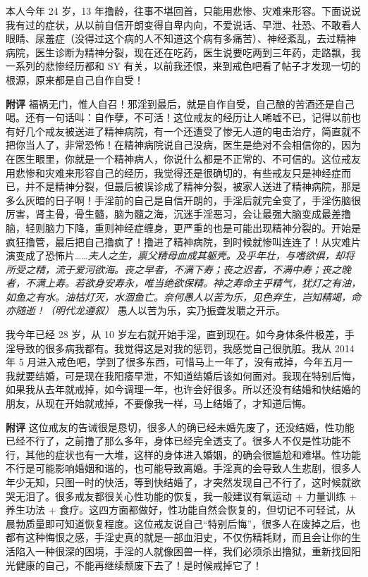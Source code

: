 \begin{case}
    本人今年 24 岁，13 年撸龄，往事不堪回首，只能用悲惨、灾难来形容。下面说说我有过的症状，从以前自信开朗变得自卑内向，不爱说话、早泄、社恐、不敢看人眼睛、尿羞症（没得过这个病的人不知道这个病有多痛苦）、神经紊乱，去过精神病院，医生诊断为精神分裂，现在还在吃药，医生说要吃两到三年药，走路飘，我一系列的悲惨经历都和 SY 有关，以前我还恨，来到戒色吧看了帖子才发现一切的根源，原来都是自己自作自受！

    \textbf{附评} 福祸无门，惟人自召！邪淫到最后，就是自作自受，自己酿的苦酒还是自己喝。还有一句话叫：自作孽，不可活！这位戒友的经历让人唏嘘不已，记得以前也有好几个戒友被送进了精神病院，有一个还遭受了惨无人道的电击治疗，简直就不把你当人了，非常恐怖！在精神病院说自己没病，医生是绝对不会相信你的，因为在医生眼里，你就是一个精神病人，你说什么都是不正常的、不可信的。这位戒友用悲惨和灾难来形容自己的经历，我觉得还是很确切的，有些戒友只是神经症而已，并不是精神分裂，但最后被误诊成了精神分裂，被家人送进了精神病院，那是多么灰暗的日子啊！手淫前的自己是自信开朗的，手淫后就完全变了，手淫伤脑很厉害，肾主骨，骨生髓，脑为髓之海，沉迷手淫恶习，会让最强大脑变成最差撸脑，轻则脑力下降，重则神经症缠身，更严重的也是可能出现精神分裂的。开始是疯狂撸管，最后把自己撸疯了！撸进了精神病院，到时候就惨叫连连了！从灾难片演变成了恐怖片……\textit{夫人之生，禀父精母血成其躯壳。及乎年壮，与嗜欲俱，却将所受之精，流于爱河欲海。丧之早者，不满下寿；丧之迟者，不满中寿；丧之晚者，不满上寿。若欲身安寿永，唯当绝欲保精。神之寿命主乎精气，犹灯之有油，如鱼之有水。油枯灯灭，水涸鱼亡。奈何愚人以苦为乐，见色弃生，岂知精竭，命亦随逝！（明代龙遵叙）} 愚人以苦为乐，实乃振聋发聩之开示。
\end{case}

\begin{case}
    我今年已经 28 岁，从 10 岁左右就开始手淫，直到现在。如今身体条件极差，手淫导致的很多病我都有。我觉得这是对我的惩罚，我感觉自己很肮脏。我从 2014 年 5 月进入戒色吧，学到了很多东西，可惜马上一年了，没有戒掉，今年五月一我就要结婚，可是现在我阳痿早泄，不知道结婚后该如何面对。我现在特别后悔，如果我从去年就戒掉，如今调理一年，也许会好很多。所以还没有结婚和快结婚的朋友，从现在开始就戒掉，不要像我一样，马上结婚了，才知道后悔。

    \textbf{附评} 这位戒友的告诫很是恳切，很多人的确已经未婚先废了，还没结婚，性功能已经不行了，之前撸了那么多年，身体已经完全透支了。很多人不仅是性功能不行，其他的症状也有一大堆，这样的身体进入婚姻，的确会很尴尬和难堪。性功能不行是可能影响婚姻和谐的，也可能导致离婚。手淫真的会导致人生悲剧，很多人年少无知，只图一时的快活，等到快结婚了，才突然发现自己不行了，这时候就欲哭无泪了。很多戒友都很关心性功能的恢复，我一般建议有氧运动 + 力量训练 + 养生功法 + 食疗。这四方面都做好，性功能自然会恢复的，但切记不可轻试，从晨勃质量即可知道恢复程度。这位戒友说自己“特别后悔”，很多人在废掉之后，也都有这种悔恨之感，手淫史真的就是一部血泪史，不仅伤精耗财，而且会让你的生活陷入一种很深的困境，手淫的人就像困兽一样，我们必须杀出撸狱，重新找回阳光健康的自己，不能再继续颓废下去了！是时候戒掉它了！
\end{case}


